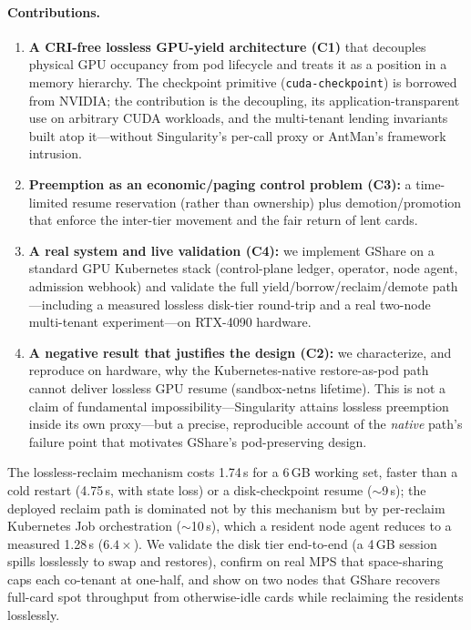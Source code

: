 \documentclass[preprint,12pt]{elsarticle}
\begin{document}
\paragraph{Contributions.}
\begin{enumerate}
\item \textbf{A CRI-free lossless GPU-yield architecture (C1)} that decouples physical GPU occupancy from
pod lifecycle and treats it as a position in a memory hierarchy. The checkpoint primitive
(\texttt{cuda-checkpoint}) is borrowed from NVIDIA; the contribution is the decoupling, its
application-transparent use on arbitrary CUDA workloads, and the multi-tenant lending invariants built atop
it---without Singularity's per-call proxy or AntMan's framework intrusion.
\item \textbf{Preemption as an economic/paging control problem (C3):} a time-limited resume reservation
(rather than ownership) plus demotion/promotion that enforce the inter-tier movement and the fair return of
lent cards.
\item \textbf{A real system and live validation (C4):} we implement GShare on a standard GPU Kubernetes
stack (control-plane ledger, operator, node agent, admission webhook) and validate the full
yield/borrow/reclaim/demote path---including a measured lossless disk-tier round-trip and a real two-node
multi-tenant experiment---on RTX-4090 hardware.
\item \textbf{A negative result that justifies the design (C2):} we characterize, and reproduce on
hardware, why the Kubernetes-native restore-as-pod path cannot deliver lossless GPU resume (sandbox-netns
lifetime). This is not a claim of fundamental impossibility---Singularity attains lossless preemption
inside its own proxy---but a precise, reproducible account of the \emph{native} path's failure point that
motivates GShare's pod-preserving design.
\end{enumerate}

The lossless-reclaim mechanism costs 1.74\,s for a 6\,GB working set, faster than a cold restart (4.75\,s,
with state loss) or a disk-checkpoint resume ($\sim$9\,s); the deployed reclaim path is dominated not by
this mechanism but by per-reclaim Kubernetes Job orchestration ($\sim$10\,s), which a resident node agent
reduces to a measured 1.28\,s ($6.4\times$). We validate the disk tier end-to-end (a 4\,GB session spills
losslessly to swap and restores), confirm on real MPS that space-sharing caps each co-tenant at one-half,
and show on two nodes that GShare recovers full-card spot throughput from otherwise-idle cards while
reclaiming the residents losslessly.
\end{document}

